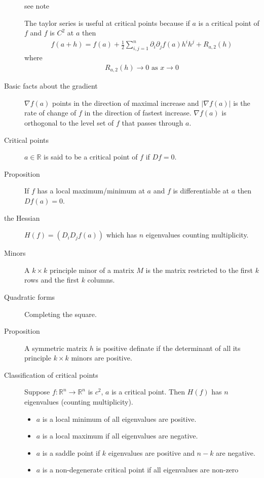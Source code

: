 \begin{description}
\item[] see note
\item[] The taylor series is useful at critical points because if $a$ is a critical point of $f$ and $f$ is $C^2$ at $a$ then
\begin{align*} 
f(a+h) = f(a) + \frac{1}{2}\sum\limits_{i, j = 1}^{n} \partial_i \partial_j f(a)h^i h^j + R_{a,2}(h)
\end{align*}
where
\begin{align*}
R_{a,2}(h) \rightarrow 0 \text{ as } x \rightarrow 0
\end{align*}
\item[Basic facts about the gradient] $\nabla f(a)$ points in the direction of maximal increase and $|\nabla f(a)|$ is the rate of change of $f$ in the direction of fastest increase. $\nabla f(a)$ is orthogonal to the level set of $f$ that passes through $a$.
\item[Critical points] $a \in \mathbb{R}$ is said to be a critical point of $f$ if $Df = 0$.
\item[Proposition] If $f$ has a local maximum/minimum at $a$ and $f$ is differentiable at $a$ then $Df(a) = 0$.
\item[the Hessian] $H(f) = (D_i D_j f(a))$ which has $n$ eigenvalues counting multiplicity.
\item[Minors] A $k \times k$ principle minor of a matrix $M$ is the matrix restricted to the first $k$ rows and the first $k$ columns.
\item[Quadratic forms] Completing the square.
\item[Proposition] A symmetric matrix $h$ is positive definate if the determinant of all its principle $k \times k$ minors are positive.
\item[Classification of critical points]
Suppose $f: \mathbb{R}^n \to \mathbb{R}^n$ is $c^2$, $a$ is a critical point. Then $H(f)$ has $n$ eigenvalues (counting multiplicity).
	\begin{itemize}
		\item $a$ is a local minimum of all eigenvalues are positive.
		\item $a$ is a local maximum if all eigenvalues are negative.
		\item $a$ is a saddle point if $k$ eigenvalues are positive and $n-k$ are negative.
		\item $a$ is a non-degenerate critical point if all eigenvalues are non-zero
	\end{itemize}

\end{description}
